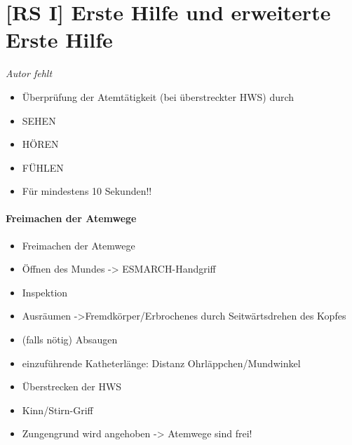 \documentclass{article}
\begin{document}
\section{[RS I] Erste Hilfe und erweiterte Erste Hilfe}
{\mdseries\itshape
Autor fehlt}

\begin{itemize}
\item {\mdseries
\"Uberpr\"ufung der Atemt\"atigkeit (bei  \"uberstreckter HWS) durch}

\end{itemize}
\begin{itemize}
\item {\mdseries
SEHEN }

\item {\mdseries
H\"OREN}

\item {\mdseries
F\"UHLEN}

\item {\mdseries
F\"ur mindestens 10  Sekunden!! }

\end{itemize}
\paragraph{Freimachen der Atemwege}
\begin{itemize}
\item {\mdseries
Freimachen der Atemwege}

\end{itemize}
\begin{itemize}
\item {\mdseries
\"Offnen des Mundes -{\textgreater} ESMARCH-Handgriff}

\item {\mdseries
Inspektion}

\item {\mdseries
Ausr\"aumen -{\textgreater}Fremdk\"orper/Erbrochenes durch
Seitw\"artsdrehen des Kopfes}

\item {\mdseries
(falls n\"otig) Absaugen}

\item {\mdseries
einzuf\"uhrende Katheterl\"ange: Distanz Ohrl\"appchen/Mundwinkel}

\item {\mdseries
\"Uberstrecken der HWS}

\item {\mdseries
Kinn/Stirn-Griff}

\item {\mdseries
Zungengrund wird angehoben -{\textgreater} Atemwege  sind frei!}

\end{itemize}
\end{document}
